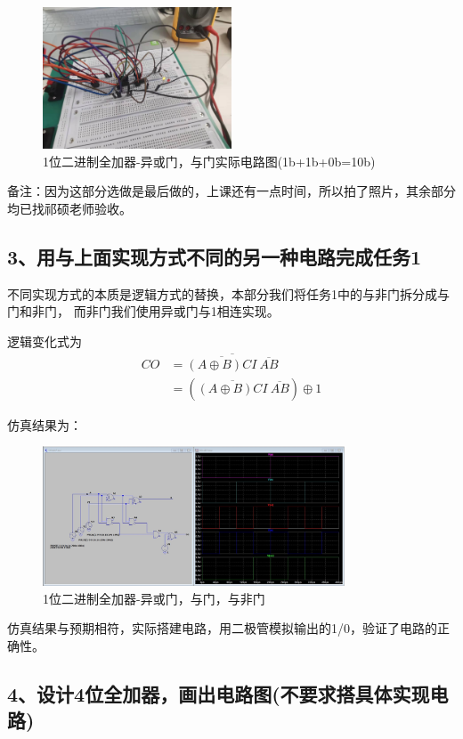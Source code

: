 \documentclass[UTF8]{ctexart}
\begin{document}
\begin{figure}[H]
    \centering
    \includegraphics[width = 0.5\textwidth]{1-2-r-2.jpg}
    \caption{1位二进制全加器-异或门，与门实际电路图(1b+1b+0b=10b)}
\end{figure}
\noindent
备注：因为这部分选做是最后做的，上课还有一点时间，所以拍了照片，其余部分均已找祁硕老师验收。

\subsection*{3、用与上面实现方式不同的另一种电路完成任务1}

不同实现方式的本质是逻辑方式的替换，本部分我们将任务1中的与非门拆分成与门和非门，
而非门我们使用异或门与1相连实现。

逻辑变化式为
\begin{align*}
    CO &= \overline{ \overline{(A \oplus B)CI}\ \overline{AB} }\\
        &= (\overline{(A \oplus B)CI}\ \overline{AB}) \oplus 1
\end{align*}

仿真结果为：

\begin{figure}[H]
    \centering
    \includegraphics[width = 0.8\textwidth]{1-3仿真.jpg}
    \caption{1位二进制全加器-异或门，与门，与非门}
\end{figure}

仿真结果与预期相符，实际搭建电路，用二极管模拟输出的1/0，验证了电路的正确性。

\subsection*{4、设计4位全加器，画出电路图(不要求搭具体实现电路)}
\end{document}

